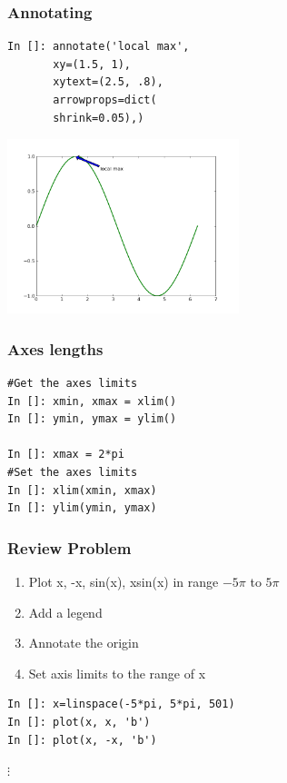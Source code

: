 \documentclass[14pt,compress]{beamer}
\begin{document}
\begin{frame}[fragile]
\frametitle{Annotating}
\vspace*{-0.15in}
\begin{lstlisting}
In []: annotate('local max', 
       xy=(1.5, 1), 
       xytext=(2.5, .8),
       arrowprops=dict(
       shrink=0.05),)
\end{lstlisting}
\vspace*{-0.2in}
\begin{center}
  \includegraphics[height=2in, interpolate=true]{data/annotate}  
\end{center}
\end{frame}

\begin{frame}[fragile]
\frametitle{Axes lengths}
  \begin{lstlisting}
#Get the axes limits
In []: xmin, xmax = xlim() 
In []: ymin, ymax = ylim() 

In []: xmax = 2*pi
#Set the axes limits
In []: xlim(xmin, xmax) 
In []: ylim(ymin, ymax) 
  \end{lstlisting}
\end{frame}

\begin{frame}[fragile]
\frametitle{Review Problem}
\begin{enumerate}
\item Plot x, -x, sin(x), xsin(x) in range $-5\pi$ to $5\pi$
\item Add a legend
\item Annotate the origin
\item Set axis limits to the range of x
\end{enumerate}
\begin{lstlisting}
In []: x=linspace(-5*pi, 5*pi, 501)
In []: plot(x, x, 'b')
In []: plot(x, -x, 'b')
\end{lstlisting}
$\vdots$
\end{frame}
\end{document}
